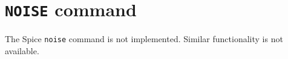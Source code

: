 %
%
%
%
\section{{\tt NOISE} command}
The Spice {\tt noise} command is not implemented.  Similar functionality is
not available.
